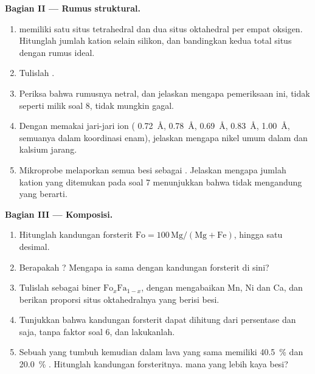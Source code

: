 \begin{problem}
\medskip
\noindent\textbf{Bagian II --- Rumus struktural.}
\begin{enumerate}[resume]
  \item {} memiliki satu situs tetrahedral dan dua situs oktahedral per empat oksigen. Hitunglah jumlah kation selain silikon, dan bandingkan kedua total situs dengan rumus ideal.
  \item Tulislah  .
  \item Periksa bahwa rumusnya netral, dan jelaskan mengapa pemeriksaan ini, tidak seperti milik soal 8, tidak mungkin gagal.
  \item Dengan memakai jari-jari ion ( \qty{0.72}{\angstrom},
         \qty{0.78}{\angstrom}, 
        \qty{0.69}{\angstrom},  \qty{0.83}{\angstrom},
         \qty{1.00}{\angstrom}, semuanya dalam koordinasi enam), jelaskan mengapa nikel umum dalam  dan kalsium jarang.
  \item Mikroprobe melaporkan semua besi sebagai . Jelaskan mengapa jumlah kation yang ditemukan pada soal 7 menunjukkan bahwa  tidak mengandung  yang berarti.
\end{enumerate}

\medskip
\noindent\textbf{Bagian III --- Komposisi.}
\begin{enumerate}[resume]
  \item Hitunglah kandungan forsterit $\mathrm{Fo} = 100\,\mathrm{Mg}/(\mathrm{Mg} +
        \mathrm{Fe})$, hingga satu desimal.
  \item Berapakah  ? Mengapa ia sama dengan kandungan forsterit di sini?
  \item Tulislah  sebagai  biner
        $\mathrm{Fo}_x\mathrm{Fa}_{1-x}$, dengan mengabaikan Mn, Ni dan Ca, dan berikan proporsi situs oktahedralnya yang berisi besi.
  \item Tunjukkan bahwa kandungan forsterit dapat dihitung dari persentase  dan  saja, tanpa faktor soal 6, dan lakukanlah.
  \item Sebuah  yang tumbuh kemudian dalam lava yang sama memiliki \qty{40.5}{\percent}  dan \qty{20.0}{\percent} . Hitunglah kandungan forsteritnya.  mana yang lebih kaya besi?
\end{enumerate}


\end{problem}
